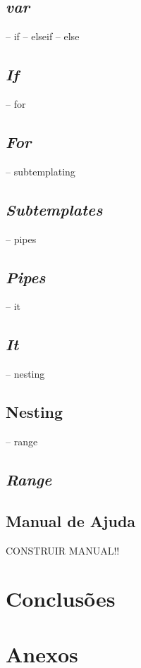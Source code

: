 \documentclass[runningheads]{llncs}
\begin{document}
\subsection{\textit{var}} \label{subsec:var}

-- if 
-- elseif
-- else 
\subsection{\textit{If}} \label{subsec:If}

-- for
\subsection{\textit{For}}\label{subsec:For}

-- subtemplating
\subsection{\textit{Subtemplates}} \label{subsec:subt}

-- pipes
\subsection{\textit{Pipes}} \label{subsec:pipes}

-- it 
\subsection{\textit{It}}\label{subsec:it}

-- nesting
\subsection{Nesting}

-- range
\subsection{\textit{Range}} \label{subsec:range}


\subsection{Manual de Ajuda}
CONSTRUIR MANUAL!!

\section{Conclusões}



\section{Anexos}\label{sec:anexos}
\end{document}
